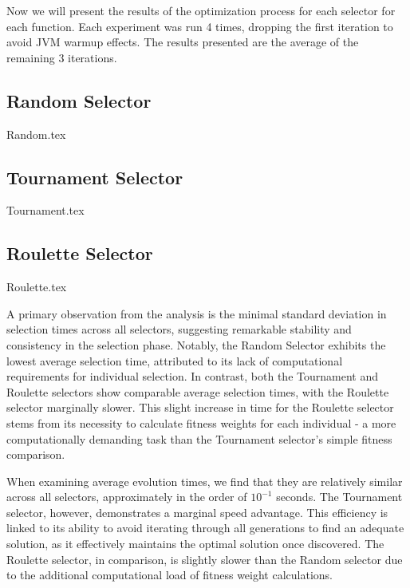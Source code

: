     Now we will present the results of the optimization process for each selector for each function.
    Each experiment was run 4 times, dropping the first iteration to avoid JVM warmup effects. The results presented are
    the average of the remaining 3 iterations.

    \newpage
    \begin{center}
        \subsection{Random Selector}
            {Random.tex}
        \subsection{Tournament Selector}
            {Tournament.tex}
        \subsection{Roulette Selector}
            {Roulette.tex}
    \end{center}

    A primary observation from the analysis is the minimal standard deviation in selection times across all selectors, 
    suggesting remarkable stability and consistency in the selection phase. Notably, the Random Selector exhibits the 
    lowest average selection time, attributed to its lack of computational requirements for individual selection. In 
    contrast, both the Tournament and Roulette selectors show comparable average selection times, with the Roulette 
    selector marginally slower. This slight increase in time for the Roulette selector stems from its necessity to 
    calculate fitness weights for each individual - a more computationally demanding task than the Tournament selector's 
    simple fitness comparison.

    When examining average evolution times, we find that they are relatively similar across all selectors, approximately 
    in the order of \(10^{-1}\) seconds. The Tournament selector, however, demonstrates a marginal speed advantage. This 
    efficiency is linked to its ability to avoid iterating through all generations to find an adequate solution, as it 
    effectively maintains the optimal solution once discovered. The Roulette selector, in comparison, is slightly slower 
    than the Random selector due to the additional computational load of fitness weight calculations.

